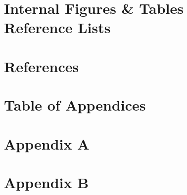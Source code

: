 \documentclass{article}
\begin{document}
\pagebreak

\section{Internal Figures \& Tables Reference Lists}

\listoftables

\listoffigures

\section{References}

\section{Table of Appendices}

\section*{Appendix A}

\section*{Appendix B}
\end{document}

